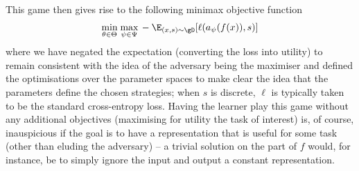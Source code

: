 %
This game then gives rise to the following minimax objective function
%
\begin{align}\label{eq:minimax-obj}
\underset{\theta \in \Theta}{\text{min}}\; \underset{\psi \in \Psi}{\text{max}}\,
%
-\E_{(x, s) \sim \gD} [ \ell(a_\psi( f(x) ), s ) ]
%
\end{align}
%
where we have negated the expectation (converting the loss into utility) to remain consistent with
the idea of the adversary being the maximiser and defined the optimisations over the parameter
spaces to make clear the idea that the parameters define the chosen strategies; when \(s\) is
discrete, \(\ell\) is typically taken to be the standard cross-entropy loss.
%
Having the learner play this game without any additional objectives (maximising for utility \wrt{}
the task of interest) is, of course, inauspicious if the goal is to have a representation that is
useful for some task (other than eluding the adversary) -- a trivial solution on the part of \(f\)
would, for instance, be to simply ignore the input and output a constant representation.
%



%
%
%


